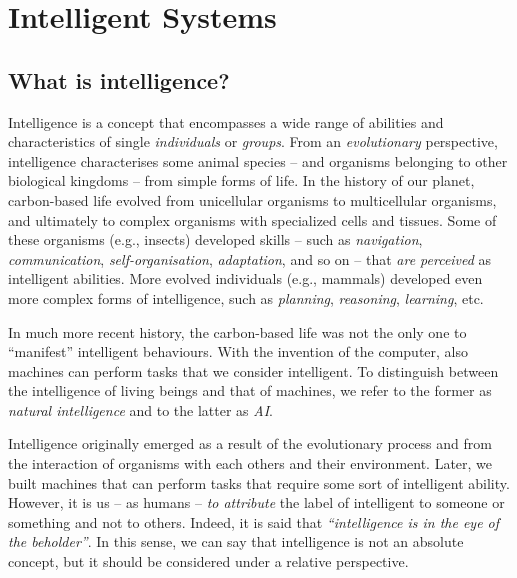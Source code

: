 
\chapter{Intelligent Systems}
\label{ch:intelligent-systems}
\mtcaddchapter
\minitoc

\section{What is intelligence?}\label{sec:what-is-intelligence}

Intelligence is a concept that encompasses a wide range of abilities and characteristics of single \emph{individuals} or \emph{groups}.
%
From an \emph{evolutionary} perspective, intelligence characterises some animal species -- and organisms belonging to other biological kingdoms -- from simple forms of life.
%
In the history of our planet, carbon-based life evolved from unicellular organisms to multicellular organisms, and ultimately to complex organisms with specialized cells and tissues.
%
Some of these organisms (e.g., insects) developed skills -- such as \emph{navigation}, \emph{communication}, \emph{self-organisation}, \emph{adaptation}, and so on -- that \emph{are perceived} as intelligent abilities.
%
More evolved individuals (e.g., mammals) developed even more complex forms of intelligence, such as \emph{planning}, \emph{reasoning}, \emph{learning}, etc.


In much more recent history, the carbon-based life was not the only one to ``manifest'' intelligent behaviours.
%
With the invention of the computer, also machines can perform tasks that we consider intelligent.
%
To distinguish between the intelligence of living beings and that of machines, we refer to the former as \emph{natural intelligence} and to the latter as \emph{\gls{AI}}.


Intelligence originally emerged as a result of the evolutionary process and from the interaction of organisms with each others and their environment.
%
Later, we built machines that can perform tasks that require some sort of intelligent ability.
%
However, it is us -- as humans -- \emph{to attribute} the label of intelligent to someone or something and not to others.
%
Indeed, it is said that \emph{``intelligence is in the eye of the beholder''}.
%
In this sense, we can say that intelligence is not an absolute concept, but it should be considered under a relative perspective.


